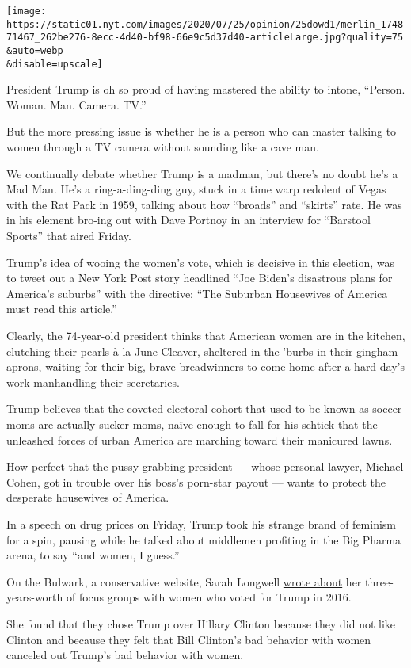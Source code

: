 \texttt{[image: https://static01.nyt.com/images/2020/07/25/opinion/25dowd1/merlin\_174871467\_262be276-8ecc-4d40-bf98-66e9c5d37d40-articleLarge.jpg?quality=75\\\&auto=webp\\\&disable=upscale]}

President Trump is oh so proud of having mastered the ability to intone,
``Person. Woman. Man. Camera. TV.''

But the more pressing issue is whether he is a person who can master
talking to women through a TV camera without sounding like a cave man.

We continually debate whether Trump is a madman, but there's no doubt
he's a Mad Man. He's a ring-a-ding-ding guy, stuck in a time warp
redolent of Vegas with the Rat Pack in 1959, talking about how
``broads'' and ``skirts'' rate. He was in his element bro-ing out with
Dave Portnoy in an interview for ``Barstool Sports'' that aired Friday.

Trump's idea of wooing the women's vote, which is decisive in this
election, was to tweet out a New York Post story headlined ``Joe Biden's
disastrous plans for America's suburbs'' with the directive: ``The
Suburban Housewives of America must read this article.''

Clearly, the 74-year-old president thinks that American women are in the
kitchen, clutching their pearls à la June Cleaver, sheltered in the
'burbs in their gingham aprons, waiting for their big, brave
breadwinners to come home after a hard day's work manhandling their
secretaries.

Trump believes that the coveted electoral cohort that used to be known
as soccer moms are actually sucker moms, naïve enough to fall for his
schtick that the unleashed forces of urban America are marching toward
their manicured lawns.

How perfect that the pussy-grabbing president --- whose personal lawyer,
Michael Cohen, got in trouble over his boss's porn-star payout --- wants
to protect the desperate housewives of America.

In a speech on drug prices on Friday, Trump took his strange brand of
feminism for a spin, pausing while he talked about middlemen profiting
in the Big Pharma arena, to say ``and women, I guess.''

On the Bulwark, a conservative website, Sarah Longwell
\href{https://thebulwark.com/what-women-want/}{wrote about} her
three-years-worth of focus groups with women who voted for Trump in
2016.

She found that they chose Trump over Hillary Clinton because they did
not like Clinton and because they felt that Bill Clinton's bad behavior
with women canceled out Trump's bad behavior with women.

